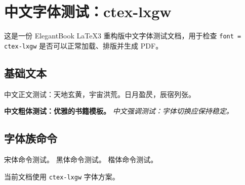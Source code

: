 \documentclass[lang = cn, font = ctex-lxgw, mode = simple]{elegantbook-l3}
\begin{document}
\frontmatter
\tableofcontents

\mainmatter
\chapter{中文字体测试：ctex-lxgw}

这是一份 ElegantBook LaTeX3 重构版中文字体测试文档，用于检查
\texttt{font = ctex-lxgw} 是否可以正常加载、排版并生成 PDF。

\section{基础文本}

中文正文测试：天地玄黄，宇宙洪荒。日月盈昃，辰宿列张。

\textbf{中文粗体测试：优雅的书籍模板。}
\emph{中文强调测试：字体切换应保持稳定。}

\section{字体族命令}

{\songti 宋体命令测试。}
{\heiti 黑体命令测试。}
{\kaishu 楷体命令测试。}

\begin{theorem}[字体方案]
  当前文档使用 \texttt{ctex-lxgw} 字体方案。
\end{theorem}
\end{document}
